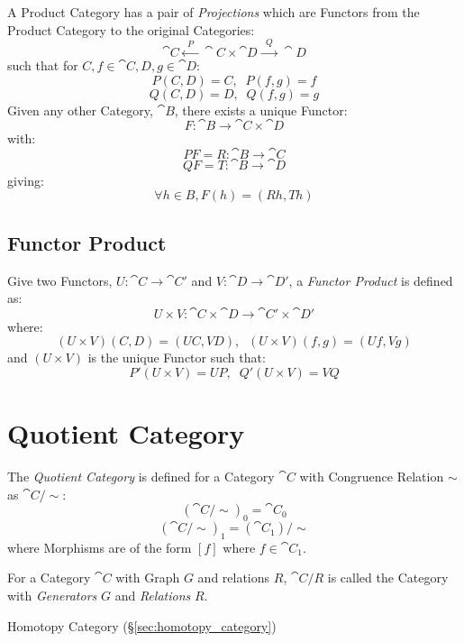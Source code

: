 A Product Category has a pair of \emph{Projections} which are Functors
from the Product Category to the original Categories:
\[
  \cat{C} \xleftarrow{\;\; P\;\;} \cat{C}\times\cat{D}
  \xrightarrow{\;\; Q\;\;} \cat{D}
\]
such that for $C,f \in \cat{C}, D,g \in \cat{D}$:
\[
  P(C,D) = C, \;\; P(f,g) = f
\]\[
  Q(C,D) = D, \;\; Q(f,g) = g
\]
Given any other Category, $\cat{B}$, there exists a unique Functor:
\[
  F : \cat{B} \rightarrow \cat{C} \times \cat{D}
\]
with:
\[
  PF = R : \cat{B} \rightarrow \cat{C}
\]\[
  QF = T : \cat{B} \rightarrow \cat{D}
\]
giving:
\[
  \forall h \in B, F(h) = (Rh,Th)
\]



\subsection{Functor Product}\label{sec:functor_product}

Give two Functors, $U : \cat{C} \rightarrow \cat{C'}$ and $V :
\cat{D} \rightarrow \cat{D'}$, a \emph{Functor Product} is
defined as:
\[
  U \times V : \cat{C} \times \cat{D}
  \rightarrow \cat{C'} \times \cat{D'}
\]
where:
\[
  (U \times V)(C,D) = (UC,VD), \;\; (U \times V)(f,g) = (Uf,Vg)
\]
and $(U \times V)$ is the unique Functor such that:
\[
  P'(U \times V) = UP, \;\; Q'(U \times V) = VQ
\]



\section{Quotient Category}\label{sec:quotient_category}


The \emph{Quotient Category} is defined for a Category $\cat{C}$
with Congruence Relation $\sim$ as $\cat{C}/\sim$:
\[
  (\cat{C}/\sim)_0 = \cat{C_0}
\]\[
  (\cat{C}/\sim)_1 = (\cat{C_1})/\sim
\]
where Morphisms are of the form $[f]$ where $f \in \cat{C_1}$.

For a Category $\cat{C}$ with Graph $G$ and relations $R$,
$\cat{C}/R$ is called the Category with \emph{Generators} $G$ and
\emph{Relations} $R$.

Homotopy Category (\S\ref{sec:homotopy_category})



